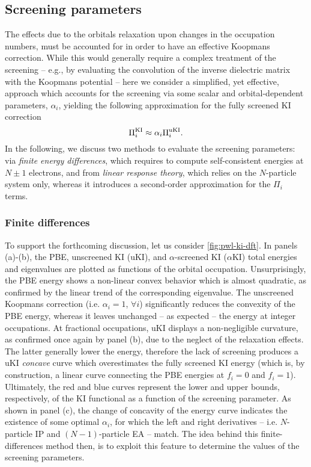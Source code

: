 \subsection{Screening parameters\label{sec:screening-parameters}}
The effects due to the orbitals relaxation upon changes in the occupation numbers, must be accounted for in order to have an effective Koopmans correction. While this would generally require a complex treatment of the screening -- e.g., by evaluating the convolution of the inverse dielectric matrix with the Koopmans potential -- here we consider a simplified, yet effective, approach which accounts for the screening via some scalar and orbital-dependent parameters, $\alpha_i$, yielding the following approximation for the fully screened KI correction
%
\begin{equation}
    \Pi_i^{\rm KI} \approx \alpha_i \Pi_i^{\rm uKI} .
    \label{eq:approx-screened-ki}
\end{equation}
%
In the following, we discuss two methods to evaluate the screening parameters: via \emph{finite energy differences}, which requires to compute self-consistent energies at $N \pm 1$ electrons, and from \emph{linear response theory}, which relies on the $N$-particle system only, whereas it introduces a second-order approximation for the $\Pi_i$ terms.

\subsubsection*{Finite differences}
To support the forthcoming discussion, let us consider \cref{fig:pwl-ki-dft}. In panels (a)-(b), the PBE, unscreened KI (uKI), and $\alpha$-screened KI ($\alpha$KI) total energies and eigenvalues are plotted as functions of the orbital occupation. Unsurprisingly, the PBE energy shows a non-linear convex behavior which is almost quadratic, as confirmed by the linear trend of the corresponding eigenvalue. The unscreened Koopmans correction (i.e. $\alpha_i=1$, $\forall i$) significantly reduces the convexity of the PBE energy, whereas it leaves unchanged -- as expected -- the energy at integer occupations. At fractional occupations, uKI displays a non-negligible curvature, as confirmed once again by panel (b), due to the neglect of the relaxation effects. The latter generally lower the energy, therefore the lack of screening produces a uKI \emph{concave} curve which overestimates the fully screened KI energy (which is, by construction, a linear curve connecting the PBE energies at $f_i=0$ and $f_i=1$). Ultimately, the red and blue curves represent the lower and upper bounds, respectively, of the KI functional as a function of the screening parameter. As shown in panel (c), the change of concavity of the energy curve indicates the existence of some optimal $\alpha_i$, for which the left and right derivatives -- i.e. $N$-particle IP and $(N-1)$-particle EA -- match. The idea behind this finite-differences method then, is to exploit this feature to determine the values of the screening parameters.

